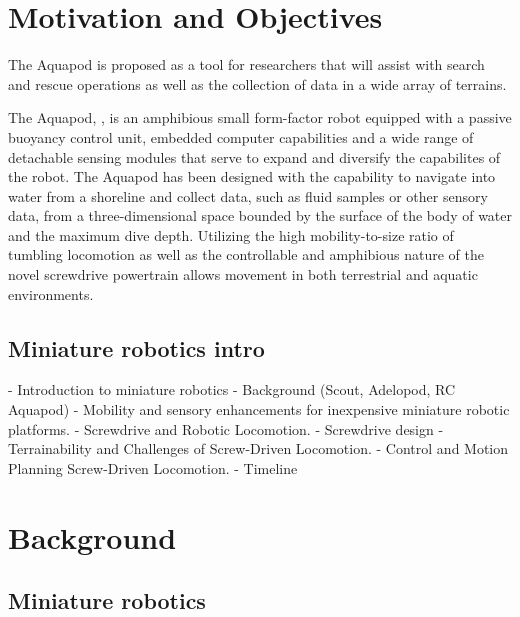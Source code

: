 \section*{Motivation and Objectives}


The Aquapod is proposed as a tool for researchers that will assist with search
and rescue operations as well as the collection of data in a wide array of
terrains.

The Aquapod, \cite{Carlson2011b} \cite{Dhull2012}, is an amphibious small
form-factor robot equipped with a passive buoyancy control unit, embedded
computer capabilities and a wide range of detachable sensing modules that serve
to expand and diversify the capabilites of the robot. The Aquapod has been
designed with the capability to navigate into water from a shoreline and collect
data, such as fluid samples or other sensory data, from a three-dimensional
space bounded by the surface of the body of water and the maximum dive depth.
Utilizing the high mobility-to-size ratio of tumbling locomotion
\cite{Hemes2009} \cite{Hemes2011} as well as the controllable and amphibious
nature of the novel screwdrive powertrain allows movement in both terrestrial
and aquatic environments.


\subsection*{Miniature robotics intro}

- Introduction to miniature robotics
- Background (Scout, Adelopod, RC Aquapod)
- Mobility and sensory enhancements for inexpensive miniature robotic platforms.
- Screwdrive and Robotic Locomotion. 
  - Screwdrive design
- Terrainability and Challenges of Screw-Driven Locomotion. 
- Control and Motion Planning Screw-Driven Locomotion.  
- Timeline


\section*{Background}

\subsection*{Miniature robotics}
